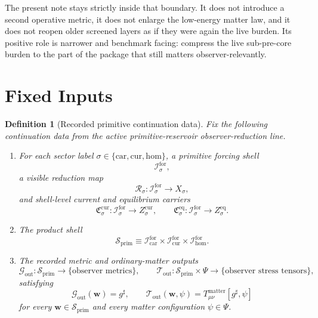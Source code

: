 \documentclass[11pt]{article}
\newcommand{\CompletedMetric}{g^{\sharp}}
\newcommand{\MatterSpace}{\Psi}
\newcommand{\Car}{\mathrm{car}}
\newcommand{\Cur}{\mathrm{cur}}
\newcommand{\Hom}{\mathrm{hom}}
\newcommand{\ForSpace}[1]{\mathcal I_{#1}^{\mathrm{for}}}
\newcommand{\PrimShell}{\mathcal S_{\mathrm{prim}}}
\newcommand{\Reduction}[1]{\mathcal R_{#1}}
\newcommand{\CurrentCarrier}[1]{\mathfrak C_{#1}^{\mathrm{cur}}}
\newcommand{\EqCarrier}[1]{\mathfrak C_{#1}^{\mathrm{eq}}}
\newcommand{\MetricOut}{\mathscr G_{\mathrm{out}}}
\newcommand{\MatterOut}{\mathscr T_{\mathrm{out}}}
\newtheorem{definition}{Definition}
\begin{document}
The present note stays strictly inside that boundary. It does not introduce a second operative metric, it does not enlarge the low-energy matter law, and it does not reopen older screened layers as if they were again the live burden. Its positive role is narrower and benchmark facing: compress the live sub-pre-core burden to the part of the package that still matters observer-relevantly.

\section{Fixed Inputs}

\begin{definition}[Recorded primitive continuation data]
\label{def:fixed}
Fix the following continuation data from the active primitive-reservoir observer-reduction line.
\begin{enumerate}
    \item For each sector label \(\sigma\in\{\Car,\Cur,\Hom\}\), a primitive forcing shell
    \[
    \ForSpace{\sigma},
    \]
    a visible reduction map
    \[
    \Reduction{\sigma}:\ForSpace{\sigma}\to X_{\sigma},
    \]
    and shell-level current and equilibrium carriers
    \[
    \CurrentCarrier{\sigma}:\ForSpace{\sigma}\to Z_{\sigma}^{\mathrm{cur}},
    \qquad
    \EqCarrier{\sigma}:\ForSpace{\sigma}\to Z_{\sigma}^{\mathrm{eq}}.
    \]
    \item The product shell
    \[
    \PrimShell
    \equiv
    \ForSpace{\Car}\times \ForSpace{\Cur}\times \ForSpace{\Hom}.
    \]
    \item The recorded metric and ordinary-matter outputs
    \[
    \MetricOut:\PrimShell\to\{\text{observer metrics}\},
    \qquad
    \MatterOut:\PrimShell\times\MatterSpace\to\{\text{observer stress tensors}\},
    \]
    satisfying
    \begin{equation}
    \MetricOut(\mathbf w)=\CompletedMetric,
    \qquad
    \MatterOut(\mathbf w,\psi)
    =
    T_{\mu\nu}^{\mathrm{matter}}[\CompletedMetric,\psi]
    \label{eq:fixedoutputs}
    \end{equation}
    for every \(\mathbf w\in\PrimShell\) and every matter configuration \(\psi\in\MatterSpace\).
\end{enumerate}
\end{definition}
\end{document}
